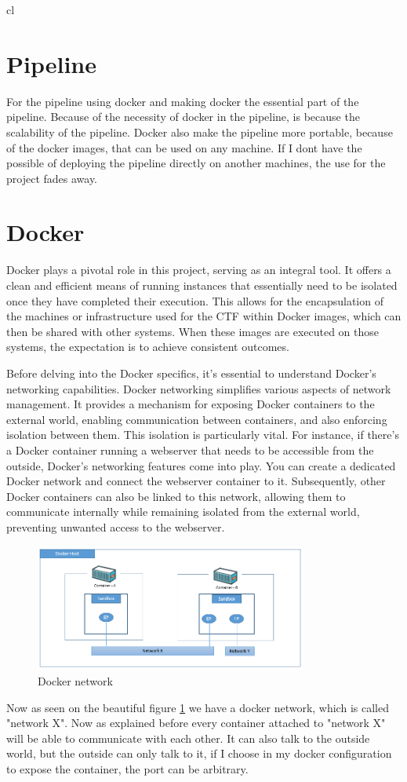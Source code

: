 cl%
\section{Pipeline}
For the pipeline using docker and making docker the essential part of the pipeline.
Because of the necessity of docker in the pipeline, is because the scalability of the pipeline.
Docker also make the pipeline more portable, because of the docker images, that can be used on any machine.
If I dont have the possible of deploying the pipeline directly on another machines, the use
for the project fades away.

\section{Docker}
\label{sec:docker}
Docker plays a pivotal role in this project, serving as an integral tool. 
It offers a clean and efficient means of running instances that essentially 
need to be isolated once they have completed their execution. 
This allows for the encapsulation of the machines or infrastructure used for the \ac{CTF} within Docker images, 
which can then be shared with other systems. When these images are executed on those systems, the expectation is to achieve consistent outcomes.

Before delving into the Docker specifics, it's essential to understand Docker's networking capabilities.
Docker networking simplifies various aspects of network management.
It provides a mechanism for exposing Docker containers to the external world, enabling communication between containers,
and also enforcing isolation between them. This isolation is particularly vital. For instance,
if there's a Docker container running a webserver that needs to be accessible from the outside,
Docker's networking features come into play. You can create a dedicated Docker network and connect
the webserver container to it. 
Subsequently, other Docker containers can also be linked to this network, 
allowing them to communicate internally while remaining isolated from the external world, preventing unwanted access to the webserver.
\begin{figure}
    \centering
    \includegraphics[width=0.8\textwidth]{images/docker_networks.png}
    \caption{Docker network}
    \label{fig:docker_network}
\end{figure}
Now as seen on the beautiful figure \ref{fig:docker_network} we have a docker network, which is called "network X".
Now as explained before every container attached to "network X" will be able to communicate with each other.
It can also talk to the outside world, but the outside can only talk to it, if I choose in my docker configuration to expose the container,
the port can be arbitrary.

